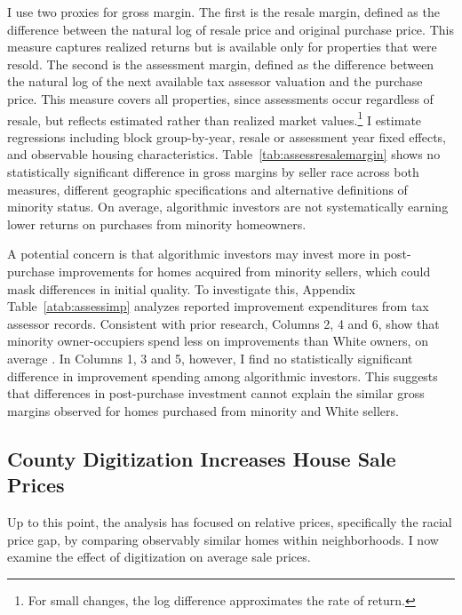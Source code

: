 \documentclass[11pt]{article}
\begin{document}
I use two proxies for gross margin. The first is the resale margin, defined as the difference between the natural log of resale price and original purchase price. This measure captures realized returns but is available only for properties that were resold. The second is the assessment margin, defined as the difference between the natural log of the next available tax assessor valuation and the purchase price. This measure covers all properties, since assessments occur regardless of resale, but reflects estimated rather than realized market values.\footnote{For small changes, the log difference approximates the rate of return.} I estimate regressions including block group-by-year, resale or assessment year fixed effects, and observable housing characteristics. Table~\ref{tab:assessresalemargin} shows no statistically significant difference in gross margins by seller race across both measures, different geographic specifications and alternative definitions of minority status. On average, algorithmic investors are not systematically earning lower returns on purchases from minority homeowners.

A potential concern is that algorithmic investors may invest more in post-purchase improvements for homes acquired from minority sellers, which could mask differences in initial quality. To investigate this, Appendix Table~\ref{atab:assessimp} analyzes reported improvement expenditures from tax assessor records. Consistent with prior research, Columns 2, 4 and 6, show that minority owner-occupiers spend less on improvements than White owners, on average \citep{bayer2016_borrowing}. In Columns 1, 3 and 5, however, I find no statistically significant difference in improvement spending among algorithmic investors. This suggests that differences in post-purchase investment cannot explain the similar gross margins observed for homes purchased from minority and White sellers.





\subsection{County Digitization Increases House Sale Prices}
Up to this point, the analysis has focused on relative prices, specifically the racial price gap, by comparing observably similar homes within neighborhoods. I now examine the effect of digitization on average sale prices. 
\end{document}

